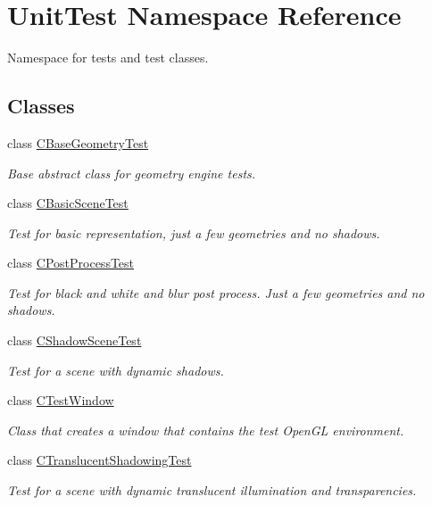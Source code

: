 \hypertarget{namespace_unit_test}{}\section{Unit\+Test Namespace Reference}
\label{namespace_unit_test}


Namespace for tests and test classes.  


\subsection*{Classes}
\begin{DoxyCompactItemize}
\item 
class \mbox{\hyperlink{class_unit_test_1_1_c_base_geometry_test}{C\+Base\+Geometry\+Test}}
\begin{DoxyCompactList}\small\item\em Base abstract class for geometry engine tests. \end{DoxyCompactList}\item 
class \mbox{\hyperlink{class_unit_test_1_1_c_basic_scene_test}{C\+Basic\+Scene\+Test}}
\begin{DoxyCompactList}\small\item\em Test for basic representation, just a few geometries and no shadows. \end{DoxyCompactList}\item 
class \mbox{\hyperlink{class_unit_test_1_1_c_post_process_test}{C\+Post\+Process\+Test}}
\begin{DoxyCompactList}\small\item\em Test for black and white and blur post process. Just a few geometries and no shadows. \end{DoxyCompactList}\item 
class \mbox{\hyperlink{class_unit_test_1_1_c_shadow_scene_test}{C\+Shadow\+Scene\+Test}}
\begin{DoxyCompactList}\small\item\em Test for a scene with dynamic shadows. \end{DoxyCompactList}\item 
class \mbox{\hyperlink{class_unit_test_1_1_c_test_window}{C\+Test\+Window}}
\begin{DoxyCompactList}\small\item\em Class that creates a window that contains the test Open\+GL environment. \end{DoxyCompactList}\item 
class \mbox{\hyperlink{class_unit_test_1_1_c_translucent_shadowing_test}{C\+Translucent\+Shadowing\+Test}}
\begin{DoxyCompactList}\small\item\em Test for a scene with dynamic translucent illumination and transparencies. \end{DoxyCompactList}\end{DoxyCompactItemize}
